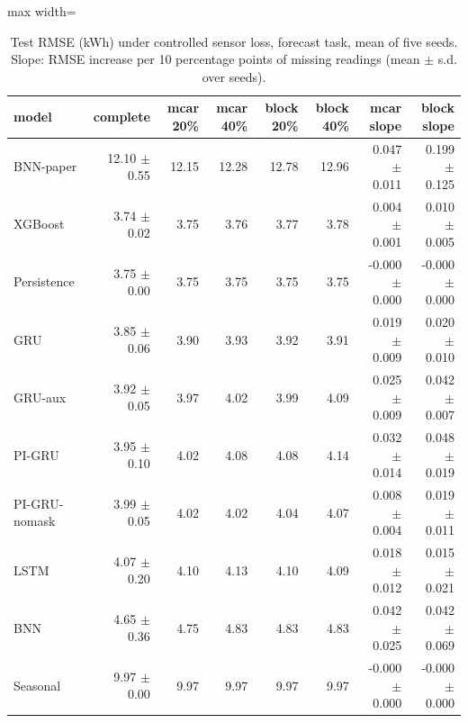 \begin{table}[H]
\centering\small
\caption{Test RMSE (kWh) under controlled sensor loss, forecast task, mean of five seeds. Slope: RMSE increase per 10 percentage points of missing readings (mean $\pm$ s.d. over seeds).}\label{tab:robust_forecast}
\begin{adjustbox}{max width=\textwidth}
\begin{tabular}{lrrrrrrr}
\toprule
model & complete & mcar 20\% & mcar 40\% & block 20\% & block 40\% & mcar slope & block slope \\
\midrule
BNN-paper & 12.10 $\pm$ 0.55 & 12.15 & 12.28 & 12.78 & 12.96 & 0.047 $\pm$ 0.011 & 0.199 $\pm$ 0.125 \\
XGBoost & 3.74 $\pm$ 0.02 & 3.75 & 3.76 & 3.77 & 3.78 & 0.004 $\pm$ 0.001 & 0.010 $\pm$ 0.005 \\
Persistence & 3.75 $\pm$ 0.00 & 3.75 & 3.75 & 3.75 & 3.75 & -0.000 $\pm$ 0.000 & -0.000 $\pm$ 0.000 \\
GRU & 3.85 $\pm$ 0.06 & 3.90 & 3.93 & 3.92 & 3.91 & 0.019 $\pm$ 0.009 & 0.020 $\pm$ 0.010 \\
GRU-aux & 3.92 $\pm$ 0.05 & 3.97 & 4.02 & 3.99 & 4.09 & 0.025 $\pm$ 0.009 & 0.042 $\pm$ 0.007 \\
PI-GRU & 3.95 $\pm$ 0.10 & 4.02 & 4.08 & 4.08 & 4.14 & 0.032 $\pm$ 0.014 & 0.048 $\pm$ 0.019 \\
PI-GRU-nomask & 3.99 $\pm$ 0.05 & 4.02 & 4.02 & 4.04 & 4.07 & 0.008 $\pm$ 0.004 & 0.019 $\pm$ 0.011 \\
LSTM & 4.07 $\pm$ 0.20 & 4.10 & 4.13 & 4.10 & 4.09 & 0.018 $\pm$ 0.012 & 0.015 $\pm$ 0.021 \\
BNN & 4.65 $\pm$ 0.36 & 4.75 & 4.83 & 4.83 & 4.83 & 0.042 $\pm$ 0.025 & 0.042 $\pm$ 0.069 \\
Seasonal & 9.97 $\pm$ 0.00 & 9.97 & 9.97 & 9.97 & 9.97 & -0.000 $\pm$ 0.000 & -0.000 $\pm$ 0.000 \\
\bottomrule
\end{tabular}
\end{adjustbox}
\end{table}
